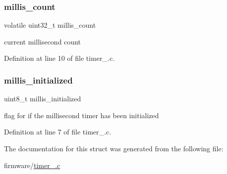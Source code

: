 \subsubsection{\texorpdfstring{millis\+\_\+count}{millis\_count}}
{\footnotesize\ttfamily volatile uint32\+\_\+t millis\+\_\+count}



current millisecond count 



Definition at line 10 of file timer\+\_.\+c.

\hypertarget{structtimer__status__t_a6d1fa9c7cc23c7a220fe2e10b21c7a36}{}\label{structtimer__status__t_a6d1fa9c7cc23c7a220fe2e10b21c7a36} 
\subsubsection{\texorpdfstring{millis\+\_\+initialized}{millis\_initialized}}
{\footnotesize\ttfamily uint8\+\_\+t millis\+\_\+initialized}



flag for if the millisecond timer has been initialized 



Definition at line 7 of file timer\+\_.\+c.



The documentation for this struct was generated from the following file\+:\begin{DoxyCompactItemize}
\item 
firmware/\hyperlink{timer__4313_8c}{timer\+\_.\+c}\end{DoxyCompactItemize}
